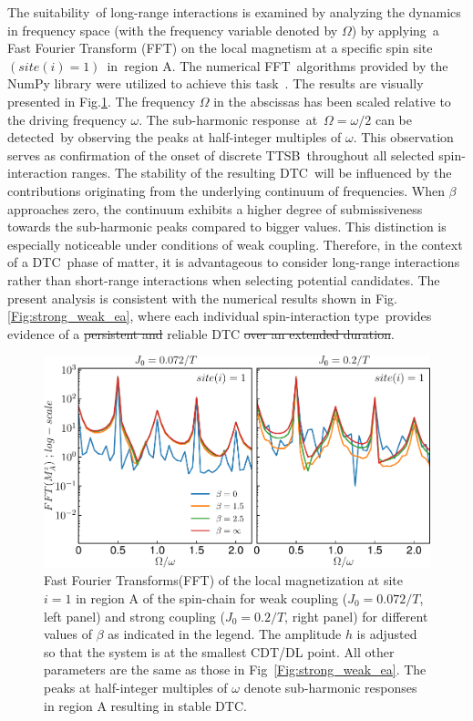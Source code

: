 \documentclass[
nofootinbib,
reprint,
superscriptaddress,
amsmath,amssymb,showkeys,
aps,
prb,
]{revtex4-2}
\begin{document}
	The suitability of long-range interactions is examined by analyzing the dynamics in frequency space (with the frequency variable denoted by $\Omega$) by applying a Fast Fourier Transform (FFT) on the local magnetism at a specific spin site $(site(i)=1)$ in region A. The numerical FFT algorithms provided by the NumPy library were utilized to achieve this task~\cite{harris2020array}. The results are visually presented in Fig.\ref{Fig:sz_single}.  The frequency $\Omega$ in the abscissas has been scaled relative to the driving frequency $\omega$. The sub-harmonic response at $\Omega=\omega/2$ can be detected by observing the peaks at half-integer multiples of $\omega$. This observation serves as confirmation of the onset of discrete TTSB throughout all selected spin-interaction ranges. The stability of the resulting DTC will be influenced by the contributions originating from the underlying continuum of frequencies. When $\beta$ approaches zero, the continuum exhibits a higher degree of submissiveness towards the sub-harmonic peaks compared to bigger values. This distinction is especially noticeable under conditions of weak coupling. Therefore, in the context of a DTC phase of matter, it is advantageous to consider long-range interactions rather than short-range interactions when selecting potential candidates. The present analysis is consistent with the numerical results shown in Fig.\ref{Fig:strong_weak_ea}, where each individual spin-interaction type provides evidence of a \sout{persistent and} reliable DTC \sout{over an extended duration}.
	\begin{figure}[t]
		\centering
		\includegraphics[width=8.cm]{single_sz_fft.pdf}
		\caption{Fast Fourier Transforms(FFT) of the local magnetization at site $i=1$ in region A of the spin-chain for weak coupling ($J_0 = 0.072/T$, left panel) and strong coupling ($J_0 = 0.2/T$, right panel) for different values of $\beta$ as indicated in the legend. The amplitude $h$ is adjusted so that the system is at the smallest CDT/DL point. All other parameters are the same as those in Fig~\ref{Fig:strong_weak_ea}. The peaks at half-integer multiples of $\omega$ denote sub-harmonic responses in region A resulting in stable DTC.}
		\label{Fig:sz_single}
	\end{figure}
	
\end{document}
